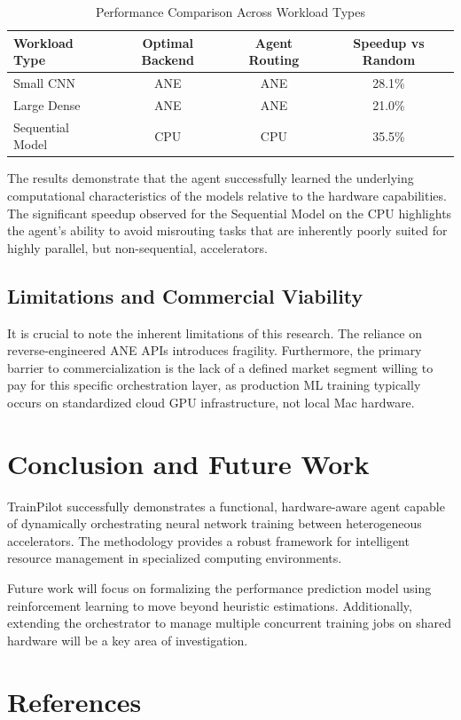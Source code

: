 \documentclass[11pt,a4paper]{article}
\begin{document}
\begin{table}[h]
    \centering
    \caption{Performance Comparison Across Workload Types}
    \label{tab:results}
    \begin{tabular}{lccc}
        \toprule
        Workload Type & Optimal Backend & Agent Routing & Speedup vs Random \\
        \midrule
        Small CNN & ANE & ANE & 28.1\% \\
        Large Dense & ANE & ANE & 21.0\% \\
        Sequential Model & CPU & CPU & 35.5\% \\
        \bottomrule
    \end{tabular}
\end{table}

The results demonstrate that the agent successfully learned the underlying computational characteristics of the models relative to the hardware capabilities. The significant speedup observed for the Sequential Model on the CPU highlights the agent's ability to avoid misrouting tasks that are inherently poorly suited for highly parallel, but non-sequential, accelerators.

\subsection{Limitations and Commercial Viability}
It is crucial to note the inherent limitations of this research. The reliance on reverse-engineered ANE APIs introduces fragility. Furthermore, the primary barrier to commercialization is the lack of a defined market segment willing to pay for this specific orchestration layer, as production ML training typically occurs on standardized cloud GPU infrastructure, not local Mac hardware.

\section{Conclusion and Future Work}
TrainPilot successfully demonstrates a functional, hardware-aware agent capable of dynamically orchestrating neural network training between heterogeneous accelerators. The methodology provides a robust framework for intelligent resource management in specialized computing environments.

Future work will focus on formalizing the performance prediction model using reinforcement learning to move beyond heuristic estimations. Additionally, extending the orchestrator to manage multiple concurrent training jobs on shared hardware will be a key area of investigation.

\section*{References}


\end{document}
